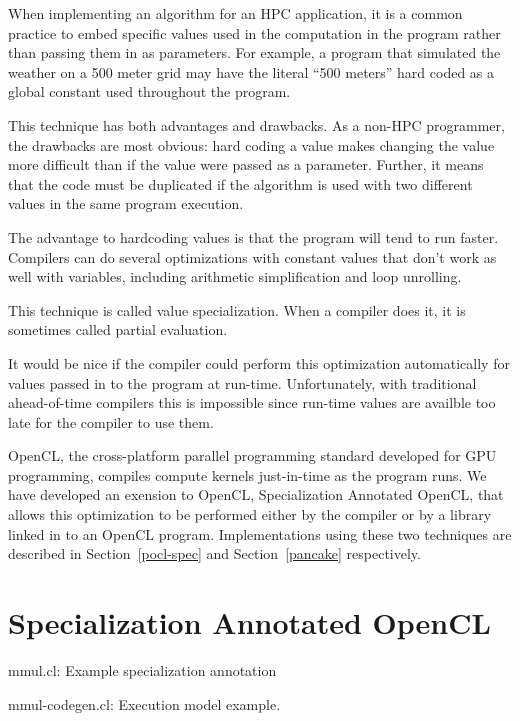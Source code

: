 \documentclass{acm_proc_article-sp}
\newcommand{\includecode}[2][C]{
    }
\begin{document}
When implementing an algorithm for an HPC application, it is a common practice
to embed specific values used in the computation in the program rather than
passing them in as parameters. For example, a program that simulated the
weather on a 500 meter grid may have the literal ``500 meters'' hard coded
as a global constant used throughout the program.

This technique has both advantages and drawbacks. As a non-HPC programmer, the
drawbacks are most obvious: hard coding a value makes changing the value more
difficult than if the value were passed as a parameter. Further, it means that
the code must be duplicated if the algorithm is used with two different values
in the same program execution. 

The advantage to hardcoding values is that the program will tend to run faster.
Compilers can do several optimizations with constant values that don't work as
well with variables, including arithmetic simplification and loop unrolling.

This technique is called value specialization. When a compiler does it, it is
sometimes called partial evaluation\cite{Futamura:1971:PE}.

It would be nice if the compiler could perform this optimization automatically
for values passed in to the program at run-time. Unfortunately, with traditional
ahead-of-time compilers this is impossible since run-time values are availble too
late for the compiler to use them.

OpenCL, the cross-platform parallel programming standard developed for GPU
programming, compiles compute kernels just-in-time as the program runs. We have
developed an exension to OpenCL, Specialization Annotated OpenCL, that allows
this optimization to be performed either by the compiler or by a library linked
in to an OpenCL program. Implementations using these two techniques are
described in Section~\ref{pocl-spec} and Section~\ref{pancake} respectively.

\section{Specialization Annotated OpenCL}

\begin{listing}
\includecode{mmul-spec.cl}
\caption{mmul.cl: Example specialization annotation}
\label{mmul-spec}
\end{listing}

\begin{listing}
\includecode{mmul-spec-example.cl}
\caption{mmul-codegen.cl: Execution model example.}
\label{mmul-spec-example}
\end{listing}
\end{document}
